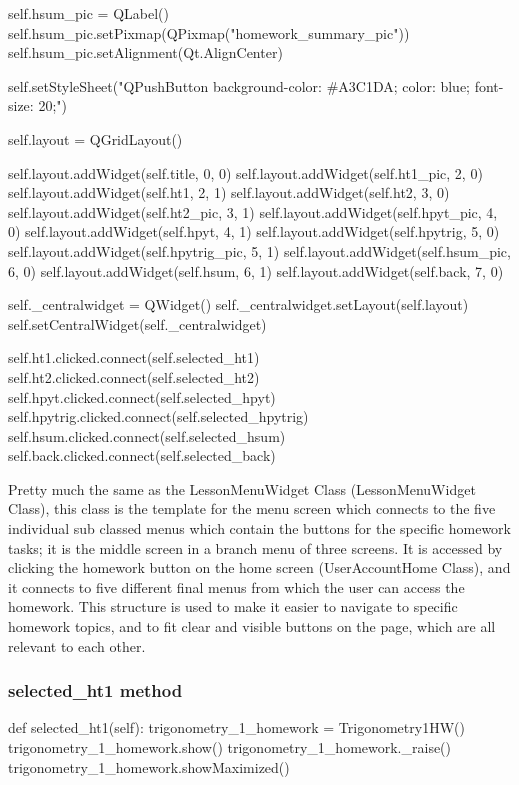 \begin{python}
        self.hsum_pic = QLabel()
        self.hsum_pic.setPixmap(QPixmap("homework_summary_pic"))
        self.hsum_pic.setAlignment(Qt.AlignCenter)

        self.setStyleSheet("QPushButton {background-color: #A3C1DA; color: blue; font-size: 20;}")

        self.layout = QGridLayout()

        self.layout.addWidget(self.title, 0, 0) 
        self.layout.addWidget(self.ht1_pic, 2, 0)
        self.layout.addWidget(self.ht1, 2, 1)
        self.layout.addWidget(self.ht2, 3, 0)
        self.layout.addWidget(self.ht2_pic, 3, 1)
        self.layout.addWidget(self.hpyt_pic, 4, 0)
        self.layout.addWidget(self.hpyt, 4, 1)
        self.layout.addWidget(self.hpytrig, 5, 0)
        self.layout.addWidget(self.hpytrig_pic, 5, 1)
        self.layout.addWidget(self.hsum_pic, 6, 0)
        self.layout.addWidget(self.hsum, 6, 1)
        self.layout.addWidget(self.back, 7, 0)

        self._centralwidget = QWidget()
        self._centralwidget.setLayout(self.layout)
        self.setCentralWidget(self._centralwidget)

        self.ht1.clicked.connect(self.selected_ht1)
        self.ht2.clicked.connect(self.selected_ht2)
        self.hpyt.clicked.connect(self.selected_hpyt)
        self.hpytrig.clicked.connect(self.selected_hpytrig)
        self.hsum.clicked.connect(self.selected_hsum)
        self.back.clicked.connect(self.selected_back)
\end{python}

Pretty much the same as the LessonMenuWidget Class (LessonMenuWidget Class), this class is the template for the menu screen which connects to the five individual sub classed menus which contain the buttons for the specific homework tasks; it is the middle screen in a branch menu of three screens. It is accessed by clicking the homework button on the home screen (UserAccountHome Class), and it connects to five different final menus from which the user can access the homework. This structure is used to make it easier to navigate to specific homework topics, and to fit clear and visible buttons on the page, which are all relevant to each other. 

\subsubsection{selected\_ht1 method}

\begin{python}
def selected_ht1(self):
        trigonometry_1_homework = Trigonometry1HW()
        trigonometry_1_homework.show()
        trigonometry_1_homework._raise()
        trigonometry_1_homework.showMaximized()
\end{python}

